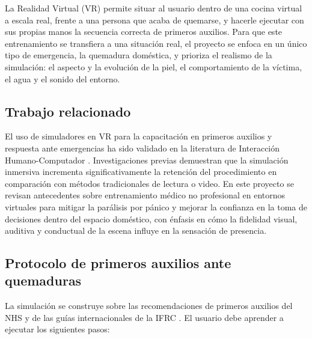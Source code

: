 \documentclass[11pt,letterpaper]{article}
\begin{document}
La Realidad Virtual (VR) permite situar al usuario dentro de una cocina virtual a escala real, frente a una persona que acaba de quemarse, y hacerle ejecutar con sus propias manos la secuencia correcta de primeros auxilios. Para que este entrenamiento se transfiera a una situación real, el proyecto se enfoca en un único tipo de emergencia, la quemadura doméstica, y prioriza el realismo de la simulación: el aspecto y la evolución de la piel, el comportamiento de la víctima, el agua y el sonido del entorno.

\subsection{Trabajo relacionado}

El uso de simuladores en VR para la capacitación en primeros auxilios y respuesta ante emergencias ha sido validado en la literatura de Interacción Humano-Computador \cite{rajan}. Investigaciones previas demuestran que la simulación inmersiva incrementa significativamente la retención del procedimiento en comparación con métodos tradicionales de lectura o video. En este proyecto se revisan antecedentes sobre entrenamiento médico no profesional en entornos virtuales para mitigar la parálisis por pánico y mejorar la confianza en la toma de decisiones dentro del espacio doméstico, con énfasis en cómo la fidelidad visual, auditiva y conductual de la escena influye en la sensación de presencia.

\subsection{Protocolo de primeros auxilios ante quemaduras}

La simulación se construye sobre las recomendaciones de primeros auxilios del NHS y de las guías internacionales de la IFRC \cite{nhs,ifrc}. El usuario debe aprender a ejecutar los siguientes pasos:
\end{document}
